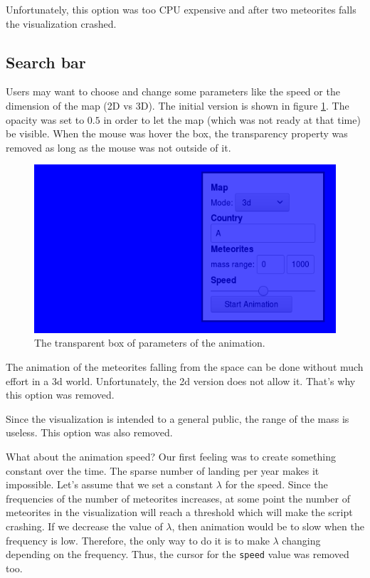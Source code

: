 \documentclass[10pt,conference,compsocconf]{IEEEtran}
\begin{document}
Unfortunately, this option was too CPU expensive and after two meteorites falls the visualization crashed. 

\subsection{Search bar}

Users may want to choose and change some parameters like the speed or the dimension of the map (2D vs 3D). The initial version is shown in figure \ref{fig:box_tool}. The opacity was set to $0.5$ in order to let the map (which was not ready at that time) be visible. When the mouse was hover the box, the transparency property was removed as long as the mouse was not outside of it.

\begin{figure}[H]
  \centering
  \includegraphics[width=\columnwidth]{images/animation_box_tool.png}
  \vspace{-3mm}
  \caption{The transparent box of parameters of the animation.}
  \label{fig:box_tool}
\end{figure}

The animation of the meteorites falling from the space can be done without much effort in a 3d world. Unfortunately, the 2d version does not allow it. That's why this option was removed.

Since the visualization is intended to a general public, the range of the mass is useless. This option was also removed.

What about the animation speed? Our first feeling was to create something constant over the time. The sparse number of landing per year makes it impossible. Let's assume that we set a constant $\lambda$ for the speed. Since the frequencies of the number of meteorites increases, at some point the number of meteorites in the visualization will reach a threshold which will make the script crashing. If we decrease the value of $\lambda$, then animation would be to slow when the frequency is low. Therefore, the only way to do it is to make $\lambda$ changing depending on the frequency. Thus, the cursor for the \texttt{speed} value was removed too.
\end{document}
